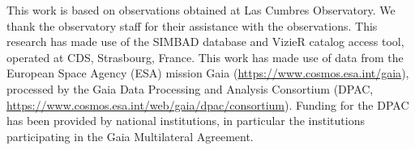 \documentclass[linenumbers,trackchanges,twocolumn]{aastex701}
\begin{document}
\begin{acknowledgments}
This work is based on observations obtained at Las Cumbres Observatory. We thank the observatory staff for their assistance with the observations. This research has made use of the SIMBAD database and VizieR catalog access tool, operated at CDS, Strasbourg, France. This work has made use of data from the European Space Agency (ESA) mission Gaia (\url{https://www.cosmos.esa.int/gaia}), processed by the Gaia Data Processing and Analysis Consortium (DPAC, \url{https://www.cosmos.esa.int/web/gaia/dpac/consortium}). Funding for the DPAC has been provided by national institutions, in particular the institutions participating in the Gaia Multilateral Agreement.
\end{acknowledgments}




\end{document}
